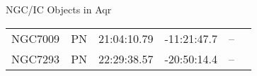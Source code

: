 \begin{block}{NGC/IC Objects in Aqr}
  \centering
  \begin{tabularx}{\textwidth}{llrrll} 
    NGC7009 & PN & 21:04:10.79 & -11:21:47.7  & -- \\ 
    NGC7293 & PN & 22:29:38.57 & -20:50:14.4  & -- \\ 
  \end{tabularx}
\end{block}